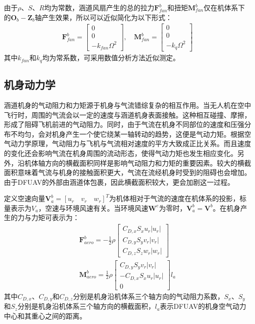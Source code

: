 由于$\rho$、$S$、$R$均为常数，涵道风扇产生的总的拉力$\boldsymbol{F}_{fan}^b$和扭矩$\boldsymbol{M}_{fan}^b$仅在机体系下的${\boldsymbol{O}_b}-{\boldsymbol{Z}_b}$轴产生效果，所以可以近似简化为以下形式\cite{choiStaticAnalysisSmall2012,manzoorCompositeObserverbasedRobust2023}：
\begin{align}
            \boldsymbol{F}_{fan}^b=\begin{bmatrix}0 \\ 0 \\
                -k_{fan}\Omega^2
            \end{bmatrix},\quad    
            \boldsymbol{M}_{fan}^b=\begin{bmatrix}0 \\ 0 \\
            -k_{q}\Omega^2
            \end{bmatrix}    \label{eq_22}
\end{align}
其中$k_{fan}$和$k_{q}$均为常系数，可采用数值分析方法近似测定。
\subsection{机身动力学}

涵道机身的气动阻力和力矩源于机身与气流错综复杂的相互作用。当无人机在空中飞行时，周围的气流会以一定的速度与涵道机身表面接触。这种相互碰撞、摩擦，形成了阻碍飞机前进的气动阻力。同时，由于气流在机身不同部位的速度和压强分布不均匀，会对机身产生一个使它绕某一轴转动的趋势，这便是气动力矩。根据空气动力学原理，气动阻力与飞机与气流相对速度的平方大致成正比关系。而且速度的变化还会影响气流在机身周围的流动形态，使得气动力矩也发生相应变化。另外，沿机体轴方向的横截面积同样是影响气动阻力和力矩的重要因素。较大的横截面积意味着气流与机身的接触面积更大，气流在流经机身时受到的阻碍也会增加。由于DFUAV的外部由涵道体包裹，因此横截面积较大，更会加剧这一过程。

定义空速向量$\boldsymbol{V}_a^b= [ u_r \quad v_r \quad w_r ]^T$为机体相对于气流的速度在机体系的投影，标量表示为$V_a$，空速与环境风速有关。当环境风速$\boldsymbol{W}^e$为零时，$\boldsymbol{V}_a^b=\boldsymbol{V}^b$。在机身产生的力与力矩可表示为\cite{johnsonModelingControlFlight2006b,choiStaticAnalysisSmall2012}：
\begin{gather}
    \boldsymbol{F}_{aero}^b=-\frac{1}{2}\rho
    \begin{bmatrix}
    C_{D,x}S_xu_r|u_r| \\
    C_{D,y}S_yv_r|v_r| \\
    C_{D,z}S_zw_r|w_r|
    \end{bmatrix}\label{eq_22.5}\\
    \boldsymbol{M}_{aero}^b=\frac{1}{2}\rho
    \begin{bmatrix}
    C_{D,y}S_yv_r|v_r| \\
    -C_{D,x}S_xu_r|u_r| \\
    0
    \end{bmatrix}l_{a}
    \label{eq_23}
\end{gather}
其中$C_{D,x}$、$C_{D,y}$和$C_{D,z}$分别是机身沿机体系三个轴方向的气动阻力系数，$S_x$、$S_y$和$S_z$分别是机身沿机体系三个轴方向的横截面积，$l_{a}$表示DFUAV的机身空气动力中心和其重心之间的距离。

